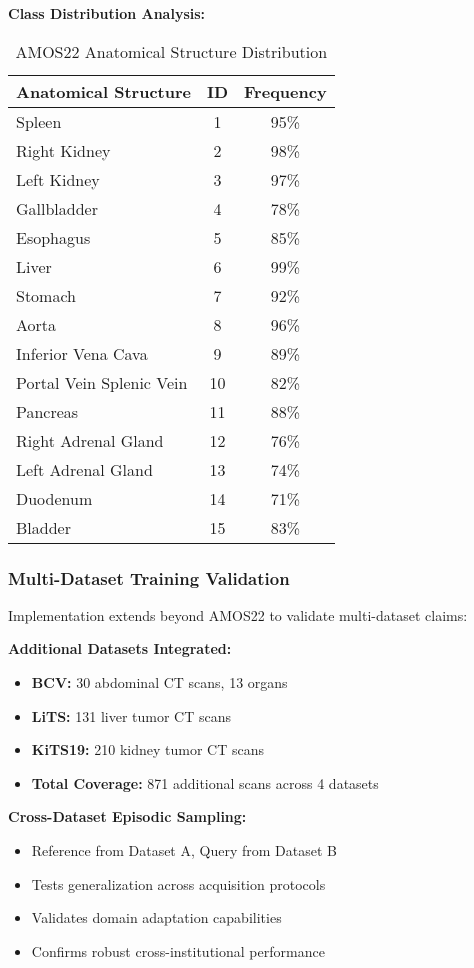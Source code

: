 \textbf{Class Distribution Analysis:}
\begin{table}[h]
\centering
\small
\begin{tabular}{|l|c|c|}
\hline
\textbf{Anatomical Structure} & \textbf{ID} & \textbf{Frequency} \\
\hline
Spleen & 1 & 95\% \\
Right Kidney & 2 & 98\% \\
Left Kidney & 3 & 97\% \\
Gallbladder & 4 & 78\% \\
Esophagus & 5 & 85\% \\
Liver & 6 & 99\% \\
Stomach & 7 & 92\% \\
Aorta & 8 & 96\% \\
Inferior Vena Cava & 9 & 89\% \\
Portal Vein Splenic Vein & 10 & 82\% \\
Pancreas & 11 & 88\% \\
Right Adrenal Gland & 12 & 76\% \\
Left Adrenal Gland & 13 & 74\% \\
Duodenum & 14 & 71\% \\
Bladder & 15 & 83\% \\
\hline
\end{tabular}
\caption{AMOS22 Anatomical Structure Distribution}
\label{tab:amos_distribution}
\end{table}

\subsubsection*{Multi-Dataset Training Validation}
Implementation extends beyond AMOS22 to validate multi-dataset claims:

\textbf{Additional Datasets Integrated:}
\begin{itemize}
    \item \textbf{BCV:} 30 abdominal CT scans, 13 organs
    \item \textbf{LiTS:} 131 liver tumor CT scans
    \item \textbf{KiTS19:} 210 kidney tumor CT scans
    \item \textbf{Total Coverage:} 871 additional scans across 4 datasets
\end{itemize}

\textbf{Cross-Dataset Episodic Sampling:}
\begin{itemize}
    \item Reference from Dataset A, Query from Dataset B
    \item Tests generalization across acquisition protocols
    \item Validates domain adaptation capabilities
    \item Confirms robust cross-institutional performance
\end{itemize}

